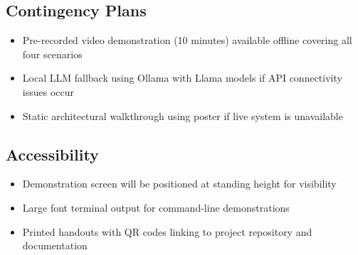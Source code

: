 \documentclass[sigconf]{aamas}
\begin{document}
\subsection*{Contingency Plans}
\begin{itemize}
    \item Pre-recorded video demonstration (10 minutes) available offline covering all four scenarios
    \item Local LLM fallback using Ollama with Llama models if API connectivity issues occur
    \item Static architectural walkthrough using poster if live system is unavailable
\end{itemize}

\subsection*{Accessibility}
\begin{itemize}
    \item Demonstration screen will be positioned at standing height for visibility
    \item Large font terminal output for command-line demonstrations
    \item Printed handouts with QR codes linking to project repository and documentation
\end{itemize}
\fi

\label{TotPages}
\end{document}
